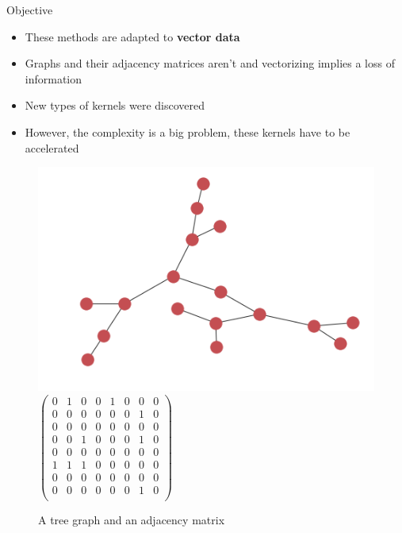 \documentclass[compress]{beamer}
\begin{document}
\begin{frame}{Objective}
\begin{itemize}
	\item These methods are adapted to \textbf{vector data}
	\item Graphs and their adjacency matrices aren't and vectorizing implies a loss of information
	\item New types of kernels were discovered
	\item However, the complexity is a big problem, these kernels have to be accelerated
\end{itemize}
\begin{figure}
	\begin{multicols}{2}
		\includegraphics[width=\linewidth]{data/graphs/big_graph_no_label.png}
		$\begin{pmatrix}
		0 & 1 & 0 & 0 & 1 & 0 & 0 & 0 \\ 
		0 & 0 & 0 & 0 & 0 & 0 & 1 & 0 \\
		0 & 0 & 0 & 0 & 0 & 0 & 0 & 0 \\
		0 & 0 & 1 & 0 & 0 & 0 & 1 & 0 \\
		0 & 0 & 0 & 0 & 0 & 0 & 0 & 0 \\
		1 & 1 & 1 & 0 & 0 & 0 & 0 & 0 \\
		0 & 0 & 0 & 0 & 0 & 0 & 0 & 0 \\
		0 & 0 & 0 & 0 & 0 & 0 & 1 & 0 \\
		\end{pmatrix}$
	\end{multicols}
\caption{A tree graph and an adjacency matrix}
\end{figure}
\end{frame}
\end{document}
